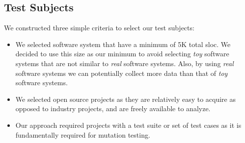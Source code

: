 \subsection{Test Subjects}
\label{subsec:experiment_test_subjects}
We constructed three simple criteria to select our test subjects:

\begin{itemize}
  \item We selected software system that have a minimum of 5K total \gls{sloc}. We decided to use this size as our minimum to avoid selecting \emph{toy} software systems that are not similar to \emph{real} software systems. Also, by using \emph{real} software systems we can potentially collect more data than that of \emph{toy} software systems.
  \item We selected open source projects as they are relatively easy to acquire as opposed to industry projects, and are freely available to analyze.
  \item Our approach required projects with a test suite or set of test cases as it is fundamentally required for mutation testing.
\end{itemize}


